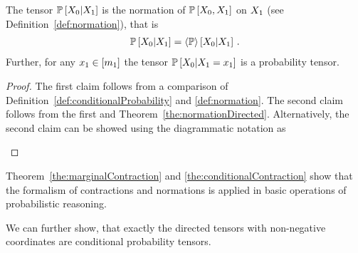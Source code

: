 \begin{theorem}\label{the:conditionalContraction}
	The tensor $\mathbb{P}\left[X_{0}|X_{1}\right]$ is the normation of $\mathbb{P}\left[X_{0},X_{1}\right]$ on $X_{1}$  (see Definition~\ref{def:normation}), that is
	\begin{align*}
		\mathbb{P}\left[X_{0}|X_{1}\right]   
		= \left\langle \mathbb{P}\right\rangle \left[ X_{0} | X_{1} \right] \, . 
	\end{align*}
	Further, for any $x_{1}\in[m_{1}]$ the tensor $\mathbb{P}\left[X_{0}|X_{1}=x_{1}\right]$ is a probability tensor.
\end{theorem}
\begin{proof}
	The first claim follows from a comparison of Definition~\ref{def:conditionalProbability} and \ref{def:normation}.
	The second claim follows from the first and Theorem~\ref{the:normationDirected}.
	Alternatively, the second claim can be showed using the diagrammatic notation as
	\begin{center}
		
	\end{center}
\end{proof}



Theorem~\ref{the:marginalContraction} and \ref{the:conditionalContraction} show that the formalism of contractions and normations is applied in basic operations of probabilistic reasoning.

We can further show, that exactly the directed tensors with non-negative coordinates are conditional probability tensors.

